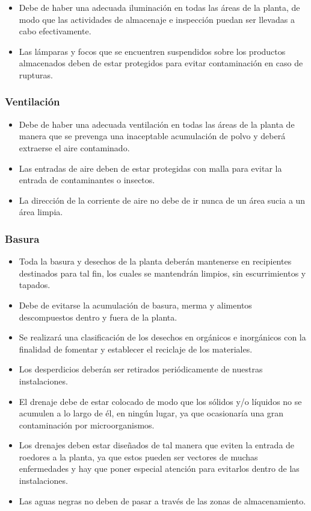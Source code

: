 \begin{itemize}
	\item Debe de haber una adecuada iluminación en todas las áreas de la planta, de modo que las actividades de almacenaje e inspección puedan ser llevadas a cabo efectivamente.
	\item Las lámparas y focos que se encuentren suspendidos sobre los productos almacenados deben de estar protegidos para evitar contaminación en caso de rupturas.
\end{itemize}

\subsubsection{Ventilación}

\begin{itemize}
	\item Debe de haber una adecuada ventilación en todas las áreas de la planta de manera que se prevenga una inaceptable acumulación de polvo y deberá extraerse el aire contaminado.
	\item Las entradas de aire deben de estar protegidas con malla para evitar la entrada de contaminantes o insectos.
	\item La dirección de la corriente de aire no debe de ir nunca de un área sucia a un área limpia.
\end{itemize}

\subsubsection{Basura}

\begin{itemize}
	\item Toda la basura y desechos de la planta deberán mantenerse en recipientes destinados para tal fin, los cuales se mantendrán limpios, sin escurrimientos y tapados.
	\item Debe de evitarse la acumulación de basura, merma y alimentos descompuestos dentro y fuera de la planta.
	\item Se realizará una clasificación de los desechos en orgánicos e inorgánicos con la finalidad de fomentar y establecer el reciclaje de los materiales.
	\item Los desperdicios deberán ser retirados periódicamente de nuestras instalaciones.
	\item El drenaje debe de estar colocado de modo que los sólidos y/o líquidos no se acumulen a lo largo de él, en ningún lugar, ya que ocasionaría una gran contaminación por microorganismos.
	\item Los drenajes deben estar diseñados de tal manera que eviten la entrada de roedores a la planta, ya que estos pueden ser vectores de muchas enfermedades y hay que poner especial atención para evitarlos dentro de las instalaciones.
	\item Las aguas negras no deben de pasar a través de las zonas de almacenamiento.
\end{itemize}

